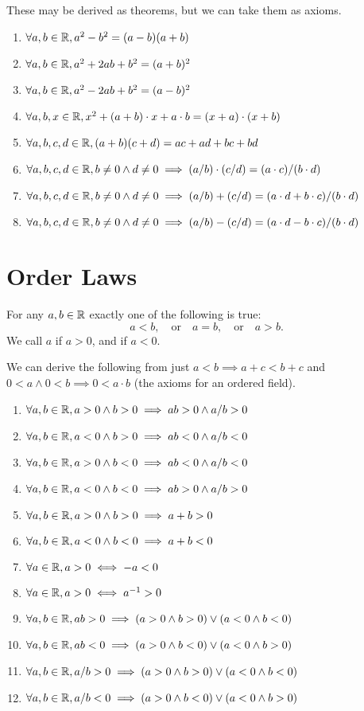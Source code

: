 These may be derived as theorems, but we can take them as axioms.
\begin{enumerate}[resume*]
\item $\forall a,b\in\mathbb{R}, a^{2} - b^{2} = (a-b)(a+b)$
\item $\forall a,b\in\mathbb{R}, a^{2} + 2ab + b^{2} = (a+b)^{2}$
\item $\forall a,b\in\mathbb{R}, a^{2} - 2ab + b^{2} = (a-b)^{2}$
\item $\forall a,b,x\in\mathbb{R}, x^{2} + (a+b)\cdot x + a\cdot b = (x+a)\cdot(x+b)$
\item $\forall a,b,c,d\in\mathbb{R}, (a+b)(c+d) = ac+ad+bc+bd$
\item $\forall a,b,c,d\in\mathbb{R}, b\neq0\land d\neq0\implies (a/b)\cdot(c/d) = (a\cdot c)/(b\cdot d)$
\item $\forall a,b,c,d\in\mathbb{R}, b\neq0\land d\neq0\implies (a/b) + (c/d) = (a\cdot d + b\cdot c)/(b\cdot d)$
\item $\forall a,b,c,d\in\mathbb{R}, b\neq0\land d\neq0\implies (a/b) - (c/d) = (a\cdot d - b\cdot c)/(b\cdot d)$
\end{enumerate}

\section{Order Laws}

 For any $a,b\in\mathbb{R}$ exactly one of the following is
true:
\begin{equation}
a < b,\quad\mbox{or}\quad a=b,\quad\mbox{or}\quad a>b.
\end{equation}
We call $a$  if $a>0$, and  if $a<0$.

 We can derive the following from just $a<b\implies a+c<b+c$ and
$0<a\land 0<b\implies 0<a\cdot b$ (the axioms for an ordered field).
\begin{enumerate}[resume*]
\item $\forall a,b\in\mathbb{R}, a>0\land b>0\implies ab>0\land a/b>0$
\item $\forall a,b\in\mathbb{R}, a<0\land b>0\implies ab<0\land a/b<0$
\item $\forall a,b\in\mathbb{R}, a>0\land b<0\implies ab<0\land a/b<0$
\item $\forall a,b\in\mathbb{R}, a<0\land b<0\implies ab>0\land a/b>0$
\item $\forall a,b\in\mathbb{R}, a>0\land b>0\implies a+b>0$
\item $\forall a,b\in\mathbb{R}, a<0\land b<0\implies a+b<0$
\item $\forall a\in\mathbb{R}, a>0\iff -a<0$
\item $\forall a\in\mathbb{R}, a>0\iff a^{-1}>0$
\item $\forall a,b\in\mathbb{R}, ab>0\implies (a>0\land b>0)\lor(a<0\land b<0)$
\item $\forall a,b\in\mathbb{R}, ab<0\implies (a>0\land b<0)\lor(a<0\land b>0)$
\item $\forall a,b\in\mathbb{R}, a/b>0\implies (a>0\land b>0)\lor(a<0\land b<0)$
\item $\forall a,b\in\mathbb{R}, a/b<0\implies (a>0\land b<0)\lor(a<0\land b>0)$
\end{enumerate}


